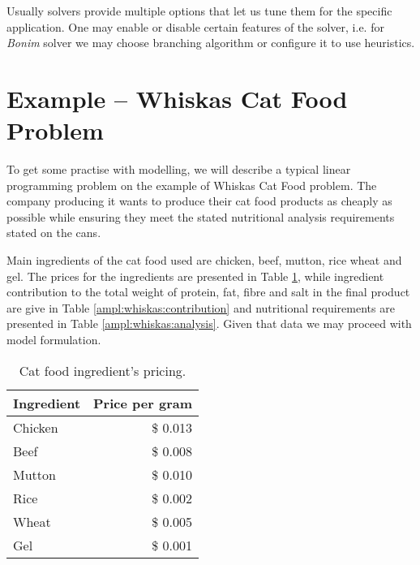 Usually solvers provide multiple options that let us tune them for the specific application. One may enable or disable certain features of the solver, i.e. for \emph{Bonim} solver we may choose branching algorithm or configure it to use heuristics.

\section{Example -- Whiskas Cat Food Problem}
\label{sec:ampl:whiskas}

To get some practise with modelling, we will describe a typical linear programming problem on the example of Whiskas Cat Food problem. The company producing it wants to produce their cat food products as cheaply as possible while ensuring they meet the stated nutritional analysis requirements stated on the cans. 

Main ingredients of the cat food used are chicken, beef, mutton, rice wheat and gel. The prices for the ingredients are presented in Table \ref{ampl:whiskas:prices}, while ingredient contribution to the total weight of protein, fat, fibre and salt in the final product are give in Table \ref{ampl:whiskas:contribution} and nutritional requirements are presented in Table \ref{ampl:whiskas:analysis}. Given that data we may proceed with model formulation.

\begin{table}
  \centering
  \begin{tabular}{| l | r |}
    \hline
    \textbf{Ingredient} & \textbf{Price per gram} \\ \hline
    Chicken & \$ 0.013 \\ \hline
    Beef & \$ 0.008 \\ \hline
    Mutton & \$ 0.010 \\ \hline
    Rice & \$ 0.002 \\ \hline
    Wheat & \$ 0.005 \\ \hline
    Gel & \$ 0.001 \\ \hline
  \end{tabular}
  \caption{Cat food ingredient's pricing.}
  \label{ampl:whiskas:prices}  
\end{table}

